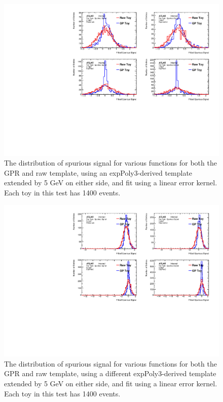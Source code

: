 \begin{figure} 
\begin{center}
  \includegraphics[width=\textwidth]{figures/background/gpr/validation/linear/ToyTest_FitSigVals_medpT_1400_noSig}   
\caption{The distribution of spurious signal for various functions for both the GPR and raw template, using an expPoly3-derived template extended by 5 GeV on either side, and fit using a linear error kernel. Each toy in this test has 1400 events.}
\label{fig:linearkernel_medpt_1400_noSig}
\end{center}
\end{figure}

\begin{figure} 
\begin{center}
  \includegraphics[width=\textwidth]{figures/background/gpr/validation/linear/ToyTest_FitSigVals_highpT_1400_noSig}   
\caption{The distribution of spurious signal for various functions for both the GPR and raw template, using a different expPoly3-derived template extended by 5 GeV on either side, and fit using a linear error kernel. Each toy in this test has 1400 events.}
\label{fig:linearkernel_highpt_1400_noSig}
\end{center}
\end{figure}


